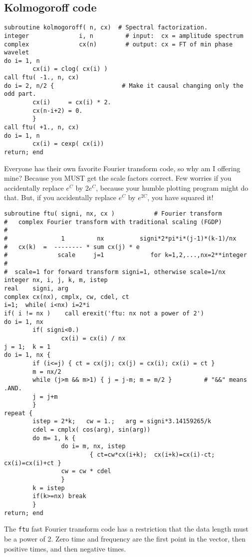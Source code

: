 \subsection{Kolmogoroff code}
\footnotesize
\begin{verbatim}
subroutine kolmogoroff( n, cx)  # Spectral factorization.
integer              i, n         # input:  cx = amplitude spectrum
complex              cx(n)        # output: cx = FT of min phase wavelet
do i= 1, n                     
        cx(i) = clog( cx(i) )
call ftu( -1., n, cx)
do i= 2, n/2 {                   # Make it causal changing only the odd part.
        cx(i)     = cx(i) * 2.
        cx(n-i+2) = 0.
        }
call ftu( +1., n, cx)
do i= 1, n
        cx(i) = cexp( cx(i))
return; end
\end{verbatim}
\normalsize
\par\noindent
Everyone has their own favorite Fourier transform code, so why am I offering mine?
Because you MUST get the scale factors correct.
Few worries if you accidentally replace $e^C$ by $2e^C$,
because your humble plotting program might do that.
But, if you accidentally replace $e^C$ by $e^{2C}$,
you have squared it!
\par
\footnotesize
\begin{verbatim}
subroutine ftu( signi, nx, cx )	          # Fourier transform
#   complex Fourier transform with traditional scaling (FGDP)
#
#               1         nx          signi*2*pi*i*(j-1)*(k-1)/nx
#   cx(k)  =  -------- * sum cx(j) * e
#              scale     j=1             for k=1,2,...,nx=2**integer
#
#  scale=1 for forward transform signi=1, otherwise scale=1/nx
integer nx, i, j, k, m, istep
real    signi, arg
complex cx(nx), cmplx, cw, cdel, ct
i=1;  while( i<nx) i=2*i
if( i != nx )    call erexit('ftu: nx not a power of 2')
do i= 1, nx
        if( signi<0.)
                cx(i) = cx(i) / nx
j = 1;  k = 1
do i= 1, nx {
        if (i<=j) { ct = cx(j); cx(j) = cx(i); cx(i) = ct }
        m = nx/2
        while (j>m && m>1) { j = j-m; m = m/2 }         # "&&" means .AND.
        j = j+m
        }
repeat {
        istep = 2*k;   cw = 1.;   arg = signi*3.14159265/k
        cdel = cmplx( cos(arg), sin(arg))
        do m= 1, k {
                do i= m, nx, istep
                        { ct=cw*cx(i+k);  cx(i+k)=cx(i)-ct;  cx(i)=cx(i)+ct }
                cw = cw * cdel
                }
        k = istep
        if(k>=nx) break
        }
return; end
\end{verbatim}
\normalsize
\par\noindent
The \texttt{ftu} fast Fourier transform code
has a restriction that the data length must be a power of 2.
Zero time and frequency are the first point in the vector,
then positive times, and then negative times.

